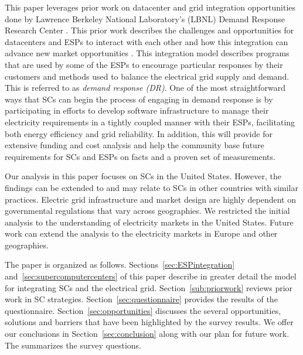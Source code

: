 This paper %
leverages prior work on datacenter and grid integration opportunities
done by Lawrence Berkeley National Laboratory's (LBNL) Demand Response 
Research Center \cite{LBNL}. This prior work describes the challenges and opportunities for datacenters and %
ESPs to interact with each other and how this integration can advance 
new market opportunities \cite{Ghatikar2012a, Ghatikar2012b}. 
This integration model describes programs that are used by some of the ESPs %
to encourage particular responses by their customers and methods 
used to balance the electrical grid supply and demand. This is referred to as \emph{demand response (DR)}.
One of the most straightforward ways that SCs can begin
the process of engaging %
in demand response is by participating in efforts to
develop software 
infrastructure to manage their electricity requirements in a tightly coupled manner 
with their ESPs, facilitating both energy efficiency and grid reliability. In addition, this will provide for extensive funding and cost analysis and help the community base future requirements for SCs and ESPs on facts and a proven set of measurements.

Our analysis in this paper focuses %
on SCs in the United States. However, 
the findings can be extended to and may relate to SCs in other countries with similar practices. 
Electric grid infrastructure and market design are highly dependent on %
governmental regulations that vary across geographies.  We restricted the initial analysis to the understanding of 
electricity markets in the United States. Future work can extend the analysis to the electricity markets in Europe and other geographies.

The paper is organized as follows.
Sections~\ref{sec:ESPintegration} and~\ref{sec:supercomputercenters} of this paper
describe in greater detail the model for 
integrating SCs and the electrical grid.
Section~\ref{sub:priorwork}
reviews prior work in SC strategies. %
Section~\ref{sec:questionnaire} provides the results of the questionnaire. 
Section~\ref{sec:opportunities} 
discusses the several opportunities, solutions and barriers that have been highlighted
by the survey results. We offer our conclusions in Section~\ref{sec:conclusion} along with our plan for future work.  
The  summarizes the survey questions.
